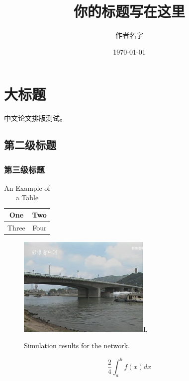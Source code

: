 \documentclass[UTF8]{ctexart}
\title{你的标题写在这里}
\author{作者名字}
\date{\today}
\begin{document}
	\maketitle  %
	\newpage  %
	
	\section{大标题} %
	中文论文排版测试。
	\subsection {第二级标题} %
	\subsubsection {第三级标题} %
	
	\begin{table}[!t]
		\renewcommand{\arraystretch}{1.3}
		\caption{An Example of a Table}
		\label{table_example}
		\centering
		\begin{tabular}{|c||c|}
			\hline
			One & Two\\
			\hline
			Three & Four\\
			\hline
		\end{tabular}
	\end{table}


\begin{figure}[!t]
	\centering
	\includegraphics[width=2.5in]{img/j1.jpg}L
	\caption{Simulation results for the network.}
	\label{fig_sim}
\end{figure}


\begin{equation}
	\frac{2} {4}
	\int_a^b f(x) dx
\end{equation}
\end{document}
